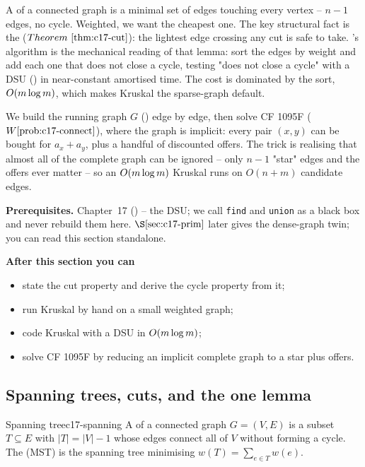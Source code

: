 \begin{topicintro}
A  of a connected graph is a minimal set of edges touching
every vertex -- \(n-1\) edges, no cycle.  Weighted, we want the cheapest one.
The key structural fact is the  (\(\thmref{c17-cut}\)): the
lightest edge crossing any cut is safe to take.  's algorithm is
the mechanical reading of that lemma: sort the edges by weight and add each one
that does not close a cycle, testing "does not close a cycle" with a DSU
() in near-constant amortised time.  The cost is dominated by the
sort, \(O(m\log m)\), which makes Kruskal the sparse-graph default.

We build the running graph \(G\) () edge by edge, then solve
CF 1095F (\(\probref{c17-connect}\)), where the graph is implicit: every pair
\((x,y)\) can be bought for \(a_x+a_y\), plus a handful of discounted offers.
The trick is realising that almost all of the complete graph can be ignored --
only \(n-1\) "star" edges and the offers ever matter -- so an \(O(m\log m)\)
Kruskal runs on \(O(n+m)\) candidate edges.

\textbf{Prerequisites.} Chapter~17 () -- the DSU; we call
\texttt{find} and \texttt{union} as a black box and never rebuild them here.
\(\secref{c17-prim}\) later gives the dense-graph twin; you can read this section
standalone.

\textbf{After this section you can}
\begin{itemize}[nosep]
  \item state the cut property and derive the cycle property from it; \hfill{}
  \item run Kruskal by hand on a small weighted graph; \hfill{}
  \item code Kruskal with a DSU in \(O(m\log m)\); \hfill{}
  \item solve CF 1095F by reducing an implicit complete graph to a star plus
        offers. \hfill{}
\end{itemize}
\end{topicintro}

\subsection{Spanning trees, cuts, and the one lemma}

\begin{definition}{Spanning tree}{c17-spanning}
A  of a connected graph \(G=(V,E)\) is a subset
\(T\subseteq E\) with \(|T|=|V|-1\) whose edges connect all of \(V\) without
forming a cycle.  The  (MST) is the spanning tree
minimising \(w(T)=\sum_{e\in T} w(e)\).
\end{definition}

